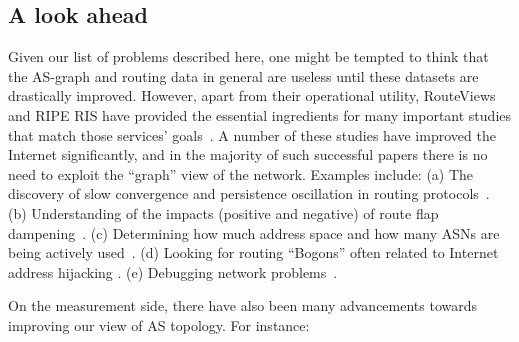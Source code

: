 

\subsection{A look ahead}

Given our list of problems described here, one might be tempted to
think that the AS-graph and routing data in general are useless until
these datasets are drastically improved. However, apart from their
operational utility, RouteViews and RIPE RIS have provided the
essential ingredients for many important studies that match those
services' goals~\cite{RISgoals}. A number of these studies have
improved the Internet significantly, and in the majority of such
successful papers there is no need to exploit the ``graph'' view of
the network. Examples include: (a) The discovery of slow convergence
and persistence oscillation in routing
protocols~\cite{varadhan96:_oscillation,labovitzSig97,labovitzInfo99,labovtizFTCS99,labovitzSig00,govindanNetworks00,griffin02:_analy_med_oscil_probl_bgp}. (b)
Understanding of the impacts (positive and negative) of route flap
dampening~\cite{mao02:_flap,pelsser:rfd}. (c) Determining how much
address space and how many ASNs are being actively
used~\cite{address_space_growth}. (d) Looking for routing ``Bogons''
often related to Internet address hijacking
\cite{ramachandran06:_spam,cymru,hijacking,nick-bogon,chinahijacking}. (e) Debugging
network
problems~\cite{bush07:_testin,feldmann04:_bgp,roughan04:_SNMP_BGPb}.

On the measurement side, there have also been many advancements
towards improving our view of AS topology. For instance:

